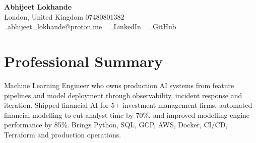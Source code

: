 \documentclass[a4paper,10pt]{article}
\begin{document}
    \begin{center}
        {\Huge\bfseries Abhijeet Lokhande}
        \\[2pt] {\color{muted}London, United Kingdom \textbar{} 07480801382}\\
        \small
        \href{mailto:abhijeet_lokhande@proton.me}{\raisebox{-0.2\height}{\color{primary}\faEnvelope}\  \underline{abhijeet\_lokhande@proton.me}} ~
        \href{https://www.linkedin.com/in/ablds/}{\raisebox{-0.2\height}{\color{primary}\faLinkedin}\ \underline{LinkedIn}}  ~
        \href{https://github.com/abhijeetscode}{\raisebox{-0.2\height}{\color{primary}\faGithub}\ \underline{GitHub}}
    \end{center}

\section{Professional Summary}
\vspace{-5pt}
{\color{muted}Machine Learning Engineer who owns production AI systems from feature pipelines and model deployment through observability, incident response and iteration. Shipped financial AI for 5+ investment management firms, automated financial modelling to cut analyst time by 70\%, and improved modelling engine performance by 85\%. Brings Python, SQL, GCP, AWS, Docker, CI/CD, Terraform and production operations.}
\vspace{2pt}

\end{document}
